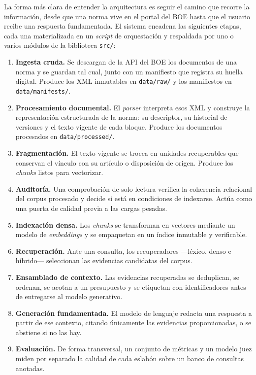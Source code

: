 La forma más clara de entender la arquitectura es seguir el camino que recorre la información, desde que una norma vive en el portal del BOE hasta que el usuario recibe una respuesta fundamentada. El sistema encadena las siguientes etapas, cada una materializada en un \emph{script} de orquestación y respaldada por uno o varios módulos de la biblioteca \texttt{src/}:
\begin{enumerate}
  \item \textbf{Ingesta cruda.} Se descargan de la API del BOE los documentos de una norma y se guardan tal cual, junto con un manifiesto que registra su huella digital. Produce los XML inmutables en \texttt{data/raw/} y los manifiestos en \texttt{data/manifests/}.

  \item \textbf{Procesamiento documental.} El \emph{parser} interpreta esos XML y construye la representación estructurada de la norma: su descriptor, su historial de versiones y el texto vigente de cada bloque. Produce los documentos procesados en \texttt{data/processed/}.

  \item \textbf{Fragmentación.} El texto vigente se trocea en unidades recuperables que conservan el vínculo con su artículo o disposición de origen. Produce los \emph{chunks} listos para vectorizar.

  \item \textbf{Auditoría.} Una comprobación de solo lectura verifica la coherencia relacional del corpus procesado y decide si está en condiciones de indexarse. Actúa como una puerta de calidad previa a las cargas pesadas.

  \item \textbf{Indexación densa.} Los \emph{chunks} se transforman en vectores mediante un modelo de \emph{embeddings} y se empaquetan en un índice inmutable y verificable.

  \item \textbf{Recuperación.} Ante una consulta, los recuperadores —léxico, denso e híbrido— seleccionan las evidencias candidatas del corpus.

  \item \textbf{Ensamblado de contexto.} Las evidencias recuperadas se deduplican, se ordenan, se acotan a un presupuesto y se etiquetan con identificadores antes de entregarse al modelo generativo.

  \item \textbf{Generación fundamentada.} El modelo de lenguaje redacta una respuesta a partir de ese contexto, citando únicamente las evidencias proporcionadas, o se abstiene si no las hay.

  \item \textbf{Evaluación.} De forma transversal, un conjunto de métricas y un modelo juez miden por separado la calidad de cada eslabón sobre un banco de consultas anotadas.
\end{enumerate}


